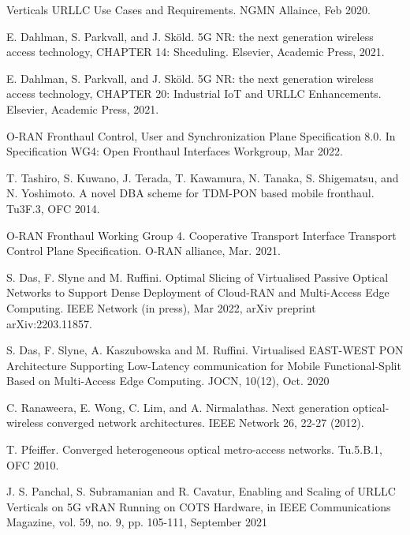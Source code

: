 \documentclass[a4paper, oneside, twocolumn, notitlepage, 10pt]{extarticle_ecoc}
\begin{document}
\begin{thebibliography}{99}
	 Verticals URLLC Use Cases and Requirements. NGMN Allaince, Feb 2020.

	E. Dahlman, S. Parkvall, and J. Sk\"{o}ld. 5G NR: the next generation wireless access technology, CHAPTER 14: Shceduling. Elsevier, Academic Press, 2021.

	E. Dahlman, S. Parkvall, and J. Sk\"{o}ld. 5G NR: the next generation wireless access technology, CHAPTER 20: Industrial IoT and URLLC Enhancements. Elsevier, Academic Press, 2021.

	 O-RAN Fronthaul Control, User and Synchronization Plane Specification 8.0. In Specification WG4: Open Fronthaul Interfaces Workgroup, Mar 2022.

    T. Tashiro, S. Kuwano, J. Terada, T. Kawamura, N. Tanaka, S. Shigematsu, and N. Yoshimoto. A novel DBA scheme for TDM-PON based mobile fronthaul. Tu3F.3, OFC 2014.
    
	 O-RAN Fronthaul Working Group 4. Cooperative Transport Interface Transport Control Plane Specification. O-RAN alliance, Mar. 2021.

	S. Das, F. Slyne and M. Ruffini. Optimal Slicing of Virtualised Passive Optical Networks to Support Dense Deployment of Cloud-RAN and Multi-Access Edge Computing. IEEE Network (in press), Mar 2022, arXiv preprint arXiv:2203.11857.
	
	S. Das, F. Slyne, A. Kaszubowska and M. Ruffini. Virtualised EAST-WEST PON Architecture Supporting Low-Latency communication for Mobile Functional-Split Based on Multi-Access Edge Computing. JOCN, 10(12), Oct. 2020

     C. Ranaweera, E. Wong, C. Lim, and A. Nirmalathas. Next generation optical-wireless converged network architectures. IEEE Network 26, 22-27 (2012).
    
     T. Pfeiffer. Converged heterogeneous optical metro-access networks. Tu.5.B.1, OFC 2010.
    
	 J. S. Panchal, S. Subramanian and R. Cavatur, Enabling and Scaling of URLLC Verticals on 5G vRAN Running on COTS Hardware, in IEEE Communications Magazine, vol. 59, no. 9, pp. 105-111, September 2021

\end{thebibliography}
\end{document}
